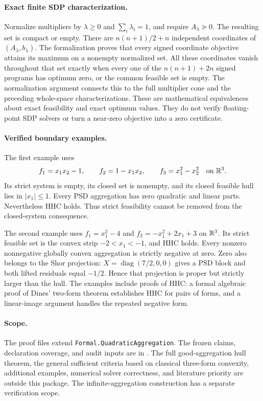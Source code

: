 \paragraph{Exact finite SDP characterization.}
Normalize multipliers by $\lambda\geq0$ and $\sum_i\lambda_i=1$, and
require $A_\lambda\succeq0$. The resulting set is compact or empty.
There are $n(n+1)/2+n$ independent coordinates of $(A_\lambda,b_\lambda)$.
The formalization proves that every signed coordinate objective attains
its maximum on a nonempty normalized set. All these coordinates vanish
throughout that set exactly when every one of the $n(n+1)+2n$ signed
programs has optimum zero, or the common feasible set is empty. The
normalization argument connects this to the full multiplier cone and
the preceding whole-space characterizations. These are mathematical
equivalences about exact feasibility and exact optimum values. They do
not verify floating-point SDP solvers or turn a near-zero objective into
a zero certificate.

\paragraph{Verified boundary examples.}
The first example uses
\[
 f_1=x_1x_2-1,\qquad f_2=1-x_1x_2,\qquad f_3=x_1^2-x_2^2
 \quad\text{on }\mathbb R^3.
\]
Its strict system is empty, its closed set is nonempty, and its closed
feasible hull lies in $|x_1|\leq1$. Every PSD aggregation has zero quadratic
and linear parts. Nevertheless HHC holds. Thus strict feasibility cannot
be removed from the closed-system consequence.

The second example uses $f_1=x_1^2-4$ and
$f_2=-x_1^2+2x_1+3$ on $\mathbb R^3$. Its strict feasible set is the convex strip
$-2<x_1<-1$, and HHC holds. Every nonzero nonnegative globally convex
aggregation is strictly negative at zero. Zero also belongs to the Shor
projection: $X=\operatorname{diag}(7/2,0,0)$ gives a PSD block and both
lifted residuals equal $-1/2$. Hence that projection is proper but strictly
larger than the hull. The examples include proofs of HHC: a formal algebraic
proof of Dines' two-form theorem establishes HHC for pairs of forms, and a
linear-image argument handles the repeated negative form.

\paragraph{Scope.}
The proof files extend \texttt{Formal.QuadraticAggregation}. The frozen
claims, declaration coverage, and audit inputs are in
.
The full good-aggregation hull theorem, the general sufficient criteria
based on classical three-form convexity, additional examples, numerical
solver correctness, and literature priority are outside this package.
The infinite-aggregation construction has a separate verification scope.
